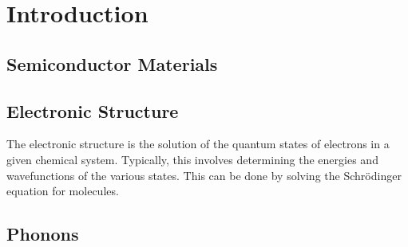 
\chapter{Introduction} %

\label{Chapter1} %


\section{Semiconductor Materials}







\section{Electronic Structure}

The electronic structure is the solution of the quantum states of electrons in a given chemical system. Typically, this involves determining the energies and wavefunctions of the various states. This can be done by solving the Schr{\"o}dinger equation for molecules.




\section{Phonons}





